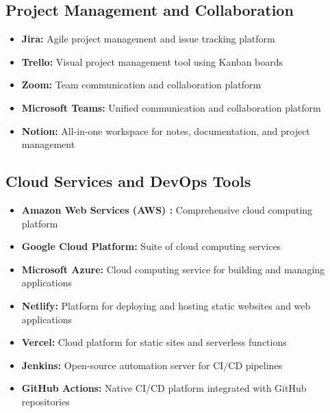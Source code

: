 \documentclass[12pt,a4paper]{report}
\newcommand{\tech}[1]{\textcolor{techcolor}{\textbf{#1}}}
\newcommand{\tool}[1]{\textcolor{toolcolor}{\textbf{#1}}}
\let\oldcite\cite
\renewcommand{\cite}[1]{\textcolor{impactcolor}{\oldcite{#1}}}
\newenvironment{coloritemize}
{\begin{itemize}[label=\textcolor{primaryblue}{$\bullet$}]}
{\end{itemize}}
\begin{document}
\subsection{Project Management and Collaboration}
\begin{coloritemize}
    \item \tool{Jira:} Agile \cite{ref8} project management and issue tracking platform
    \item \tool{Trello:} Visual project management tool using Kanban boards
    \item \tool{Zoom:} Team communication and collaboration platform
    \item \tool{Microsoft Teams:} Unified communication and collaboration platform
    \item \tool{Notion:} All-in-one workspace for notes, documentation, and project management
\end{coloritemize}

\subsection{Cloud Services and DevOps Tools}
\begin{coloritemize}
    \item \tech{Amazon Web Services (AWS) \cite{ref7}:} Comprehensive cloud computing platform
    \item \tech{Google Cloud Platform:} Suite of cloud computing services
    \item \tech{Microsoft Azure:} Cloud computing service for building and managing applications
    \item \tech{Netlify:} Platform for deploying and hosting static websites and web applications
    \item \tech{Vercel:} Cloud platform for static sites and serverless functions
    \item \tool{Jenkins:} Open-source automation server for CI/CD pipelines
    \item \tool{GitHub Actions:} Native CI/CD platform integrated with GitHub repositories
\end{coloritemize}
\end{document}
